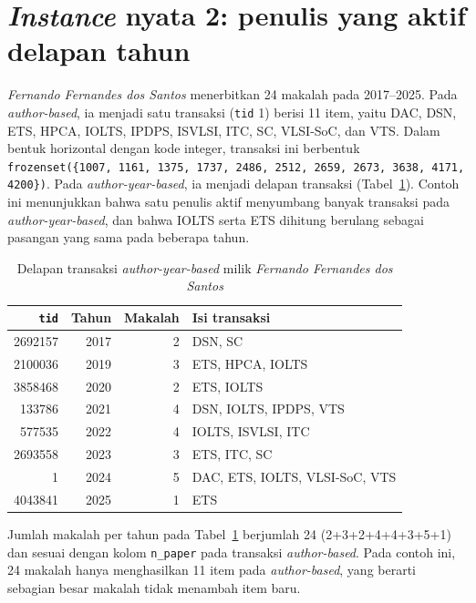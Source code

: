\section{\textit{Instance} nyata 2: penulis yang aktif delapan tahun}
\label{sec:instance2}
\textit{Fernando Fernandes dos Santos} menerbitkan 24 makalah pada 2017--2025. Pada \textit{author-based}, ia menjadi satu transaksi (\texttt{tid} 1) berisi 11 item, yaitu DAC, DSN, ETS, HPCA, IOLTS, IPDPS, ISVLSI, ITC, SC, VLSI-SoC, dan VTS. Dalam bentuk horizontal dengan kode integer, transaksi ini berbentuk \texttt{frozenset(\{1007, 1161, 1375, 1737, 2486, 2512, 2659, 2673, 3638, 4171, 4200\})}. Pada \textit{author-year-based}, ia menjadi delapan transaksi (Tabel~\ref{tab:instance2}). Contoh ini menunjukkan bahwa satu penulis aktif menyumbang banyak transaksi pada \textit{author-year-based}, dan bahwa IOLTS serta ETS dihitung berulang sebagai pasangan yang sama pada beberapa tahun.

\begin{table}[!htb]
\caption{Delapan transaksi \textit{author-year-based} milik \textit{Fernando Fernandes dos Santos}}
\label{tab:instance2}
\footnotesize
\begin{tabularx}{\textwidth}{@{}rrrX@{}}
\toprule
\textbf{\texttt{tid}} & \textbf{Tahun} & \textbf{Makalah} & \textbf{Isi transaksi} \\
\midrule
2692157 & 2017 & 2 & DSN, SC \\
2100036 & 2019 & 3 & ETS, HPCA, IOLTS \\
3858468 & 2020 & 2 & ETS, IOLTS \\
133786 & 2021 & 4 & DSN, IOLTS, IPDPS, VTS \\
577535 & 2022 & 4 & IOLTS, ISVLSI, ITC \\
2693558 & 2023 & 3 & ETS, ITC, SC \\
1 & 2024 & 5 & DAC, ETS, IOLTS, VLSI-SoC, VTS \\
4043841 & 2025 & 1 & ETS \\
\bottomrule
\end{tabularx}
\end{table}

Jumlah makalah per tahun pada Tabel~\ref{tab:instance2} berjumlah 24 (2+3+2+4+4+3+5+1) dan sesuai dengan kolom \texttt{n\_paper} pada transaksi \textit{author-based}. Pada contoh ini, 24 makalah hanya menghasilkan 11 item pada \textit{author-based}, yang berarti sebagian besar makalah tidak menambah item baru.
